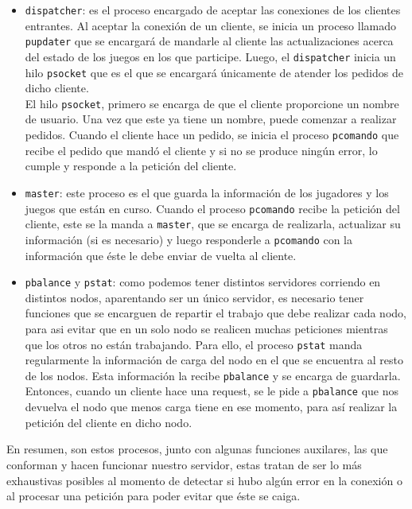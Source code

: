 \documentclass[11pt]{article}
\begin{document}
\begin{itemize}
    \item \texttt{dispatcher}: es el proceso encargado de aceptar las conexiones de los clientes
          entrantes. Al aceptar la conexión de un cliente, se inicia un proceso llamado
          \texttt{pupdater} que se encargará de mandarle al cliente las actualizaciones acerca del
          estado de los juegos en los que participe. Luego, el \texttt{dispatcher} inicia
          un hilo \texttt{psocket} que es el que se encargará únicamente de atender los pedidos de dicho
          cliente. \\
          El hilo \texttt{psocket}, primero se encarga de que el cliente proporcione un 
          nombre de usuario. Una vez que este ya tiene un nombre, puede comenzar a realizar
          pedidos. Cuando el cliente hace un pedido, se inicia el proceso \texttt{pcomando}
          que recibe el pedido que mandó el cliente y si no se produce ningún error, lo cumple
          y responde a la petición del cliente. 
    \item \texttt{master}: este proceso es el que guarda la información de los jugadores y 
          los juegos que están en curso. Cuando el proceso \texttt{pcomando} recibe la
          petición del cliente, este se la manda a \texttt{master}, que se encarga de 
          realizarla, actualizar su información (si es necesario) y luego responderle a \texttt{pcomando} con la información que éste
          le debe enviar de vuelta al cliente.
    \item \texttt{pbalance} y \texttt{pstat}: como podemos tener distintos servidores corriendo
          en distintos nodos, aparentando ser un único servidor, es necesario tener funciones
          que se encarguen de repartir el trabajo que debe realizar cada nodo, para asi evitar 
          que en un solo nodo se realicen muchas peticiones mientras que los otros no están trabajando.
          Para ello, el proceso \texttt{pstat} manda regularmente la información de carga del nodo en el que
          se encuentra al resto de los nodos. Esta información la recibe \texttt{pbalance} y se encarga de
          guardarla. Entonces, cuando un cliente hace una request, se le pide a \texttt{pbalance} que
          nos devuelva el nodo que menos carga tiene en ese momento, para así realizar la petición del 
          cliente en dicho nodo. 
\end{itemize}

En resumen, son estos procesos, junto con algunas funciones auxilares, las que conforman
y hacen funcionar nuestro servidor, estas tratan de ser lo más exhaustivas posibles al
momento de detectar si hubo algún error en la conexión o al procesar una petición para poder
evitar que éste se caiga.
\end{document}
